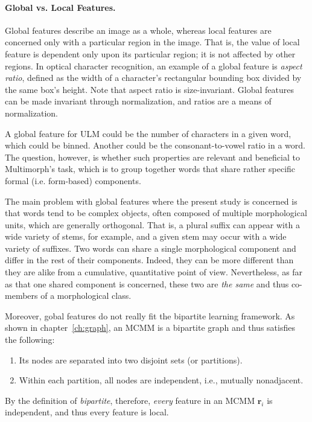 \paragraph{Global vs. Local Features.}
Global features describe an image as a whole, whereas local features are concerned
only with a particular region in the image. That is, the value of local feature is dependent
only upon its particular region; it is not affected by other regions. 
In optical character recognition, an example of a global feature is \emph{aspect ratio}, defined 
as the width of a character's rectangular bounding box divided by the same 
box's height. Note that aspect ratio is size-invariant. Global features 
can be made invariant 
through normalization, and ratios are a means of normalization.

A global feature for ULM could be the number 
of characters in a given word, which could be binned. Another 
could be the consonant-to-vowel ratio in a word. The question, however, is 
whether such properties are relevant and beneficial to Multimorph's task,
which is to group together words that share rather specific formal (i.e. form-based) components. 

The main problem with global features where the present study is concerned is that
words tend to be complex objects, often composed of 
multiple morphological units, which are 
generally orthogonal. That is, a plural suffix can 
appear with a wide variety of stems, for example, and a 
given stem may occur with a wide variety of suffixes.
Two words can share a single morphological component and 
differ in the rest of their components. Indeed,
they can be more different than they are alike from a cumulative, 
quantitative point of view. Nevertheless,
as far as that one shared component is concerned, these two are 
\emph{the same} and thus co-members of a morphological
class. 

Moreover, gobal features do not really fit the bipartite learning framework.
As shown in chapter~\ref{ch:graph}, an MCMM is a bipartite graph and thus 
satisfies the following:
\begin{enumerate}
\item Its nodes are separated into two disjoint sets (or partitions).
\item Within each partition, all nodes are independent, i.e., mutually 
nonadjacent.
\end{enumerate}
By the definition of \emph{bipartite}, therefore, \emph{every} feature in an MCMM $\textbf{r}_i$ is independent,
and thus every feature is local. 

